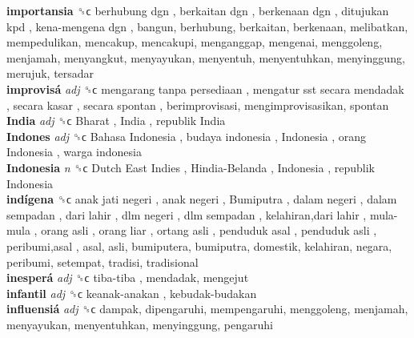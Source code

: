\textbf{importansia} ␝ϲ   berhubung dgn ,  berkaitan dgn ,  berkenaan dgn ,  ditujukan kpd ,  kena-mengena dgn , bangun, berhubung, berkaitan, berkenaan, melibatkan, mempedulikan, mencakup, mencakupi, menganggap, mengenai, menggoleng, menjamah, menyangkut, menyayukan, menyentuh, menyentuhkan, menyinggung, merujuk, tersadar  \\
\textbf{improvisá} \emph{adj}  ␝ϲ   mengarang tanpa persediaan ,  mengatur sst secara mendadak ,  secara kasar ,  secara spontan , berimprovisasi, mengimprovisasikan, spontan  \\
\textbf{India} \emph{adj}  ␝ϲ   Bharat ,  India ,  republik India   \\
\textbf{Indones} \emph{adj}  ␝ϲ   Bahasa Indonesia ,  budaya indonesia ,  Indonesia ,  orang Indonesia ,  warga indonesia   \\
\textbf{Indonesia} \emph{n}  ␝ϲ   Dutch East Indies ,  Hindia-Belanda ,  Indonesia ,  republik Indonesia   \\
\textbf{indígena} ␝ϲ   anak jati negeri ,  anak negeri ,  Bumiputra ,  dalam negeri ,  dalam sempadan ,  dari lahir ,  dlm negeri ,  dlm sempadan ,  kelahiran,dari lahir ,  mula-mula ,  orang asli ,  orang liar ,  ortang asli ,  penduduk asal ,  penduduk asli ,  peribumi,asal , asal, asli, bumiputera, bumiputra, domestik, kelahiran, negara, peribumi, setempat, tradisi, tradisional  \\
\textbf{inesperá} \emph{adj}  ␝ϲ   tiba-tiba , mendadak, mengejut  \\
\textbf{infantil} \emph{adj}  ␝ϲ   keanak-anakan ,  kebudak-budakan   \\
\textbf{influensiá} \emph{adj}  ␝ϲ  dampak, dipengaruhi, mempengaruhi, menggoleng, menjamah, menyayukan, menyentuhkan, menyinggung, pengaruhi  \\
